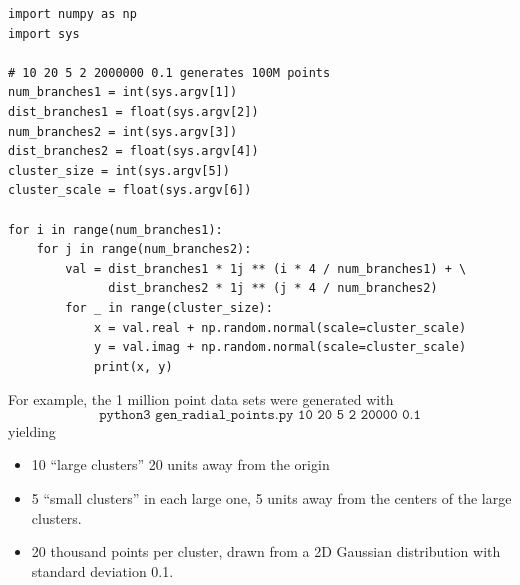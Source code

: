 \documentclass{article}
\begin{document}
	\begin{lstlisting}
import numpy as np
import sys

# 10 20 5 2 2000000 0.1 generates 100M points
num_branches1 = int(sys.argv[1])
dist_branches1 = float(sys.argv[2])
num_branches2 = int(sys.argv[3])
dist_branches2 = float(sys.argv[4])
cluster_size = int(sys.argv[5])
cluster_scale = float(sys.argv[6])

for i in range(num_branches1):
    for j in range(num_branches2):
        val = dist_branches1 * 1j ** (i * 4 / num_branches1) + \
              dist_branches2 * 1j ** (j * 4 / num_branches2)
        for _ in range(cluster_size):
            x = val.real + np.random.normal(scale=cluster_scale)
            y = val.imag + np.random.normal(scale=cluster_scale)
            print(x, y)
	\end{lstlisting}
	
	For example, the 1 million point data sets were generated with
	\[\texttt{python3 gen\_radial\_points.py 10 20 5 2 20000 0.1}\]
	yielding
	\begin{itemize}
		\item 10 ``large clusters'' 20 units away from the origin
		\item 5 ``small clusters'' in each large one, 5 units away from the centers of the large clusters.
		\item 20 thousand points per cluster, drawn from a 2D Gaussian distribution with standard deviation 0.1.
	\end{itemize}
\end{document}
